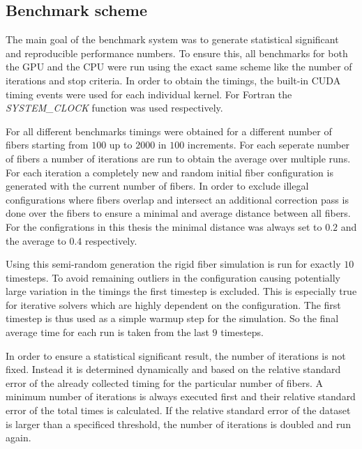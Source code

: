 \documentclass[a4paper,11pt]{kth-mag}
\begin{document}
\subsection{Benchmark scheme}

The main goal of the benchmark system was to generate statistical significant and reproducible performance numbers. To ensure this, all benchmarks for both the GPU and the CPU were run using the exact same scheme like the number of iterations and stop criteria. In order to obtain the timings, the built-in CUDA timing events were used for each individual kernel. For Fortran the \emph{SYSTEM\_CLOCK} function was used respectively.

For all different benchmarks timings were obtained for a different number of fibers starting from $100$ up to $2000$ in $100$ increments. For each seperate number of fibers a number of iterations are run to obtain the average over multiple runs. For each iteration a completely new and random initial fiber configuration is generated with the current number of fibers. In order to exclude illegal configurations where fibers overlap and intersect an additional correction pass is done over the fibers to ensure a minimal and average distance between all fibers. For the configrations in this thesis the minimal distance was always set to $0.2$ and the average to $0.4$ respectively.

Using this semi-random generation the rigid fiber simulation is run for exactly $10$ timesteps. To avoid remaining outliers in the configuration causing potentially large variation in the timings the first timestep is excluded. This is especially true for iterative solvers which are highly dependent on the configuration. The first timestep is thus used as a simple warmup step for the simulation. So the final average time for each run is taken from the last $9$ timesteps.

In order to ensure a statistical significant result, the number of iterations is not fixed. Instead it is determined dynamically and based on the relative standard error of the already collected timing for the particular number of fibers. A minimum number of iterations is always executed first and their relative standard error of the total times is calculated. If the relative standard error of the dataset is larger than a specificed threshold, the number of iterations is doubled and run again.
\end{document}
